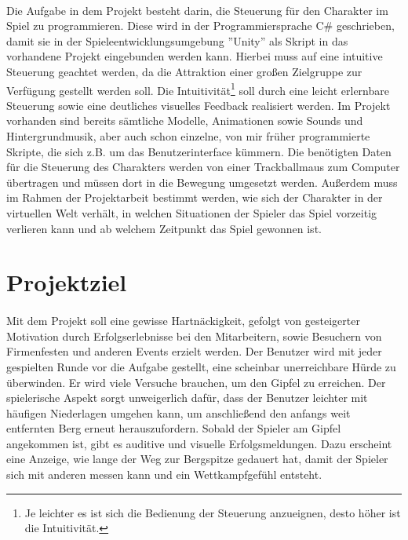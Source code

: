 \paragraph{}
Die Aufgabe in dem Projekt besteht darin, die Steuerung für den Charakter im Spiel zu programmieren. Diese wird in der Programmiersprache C\# geschrieben, damit sie in der Spieleentwicklungsumgebung ”Unity” als Skript in das vorhandene Projekt eingebunden werden kann. Hierbei muss auf eine intuitive Steuerung geachtet werden, da die Attraktion einer großen Zielgruppe zur Verfügung gestellt werden soll. Die Intuitivität\footnote{Je leichter es ist sich die Bedienung der Steuerung anzueignen, desto höher ist die Intuitivität.} soll durch eine leicht erlernbare Steuerung sowie eine deutliches visuelles Feedback realisiert werden. Im Projekt vorhanden sind bereits sämtliche Modelle, Animationen sowie Sounds und Hintergrundmusik, aber auch schon einzelne, von mir früher programmierte Skripte, die sich z.B. um das Benutzerinterface kümmern. Die benötigten Daten für die Steuerung des Charakters werden von einer Trackballmaus zum Computer übertragen und müssen dort in die Bewegung umgesetzt werden. Außerdem muss im Rahmen der Projektarbeit bestimmt werden, wie sich der Charakter in der virtuellen Welt verhält, in welchen Situationen der Spieler das Spiel vorzeitig verlieren kann und ab welchem Zeitpunkt das Spiel gewonnen ist.

\section{Projektziel}
\paragraph{}
Mit dem Projekt soll eine gewisse Hartnäckigkeit, gefolgt von gesteigerter Motivation durch Erfolgserlebnisse bei den Mitarbeitern, sowie Besuchern von Firmenfesten und anderen Events erzielt werden. Der Benutzer wird mit jeder gespielten Runde vor die Aufgabe gestellt, eine scheinbar unerreichbare Hürde zu überwinden. Er wird viele Versuche brauchen, um den Gipfel zu erreichen. Der spielerische Aspekt sorgt unweigerlich dafür, dass der Benutzer leichter mit häufigen Niederlagen umgehen kann, um anschließend den anfangs weit entfernten Berg erneut herauszufordern. Sobald der Spieler am Gipfel angekommen ist, gibt es auditive und visuelle Erfolgsmeldungen. Dazu erscheint eine Anzeige, wie lange der Weg zur Bergspitze gedauert hat, damit der Spieler sich mit anderen messen kann und ein Wettkampfgefühl entsteht.

